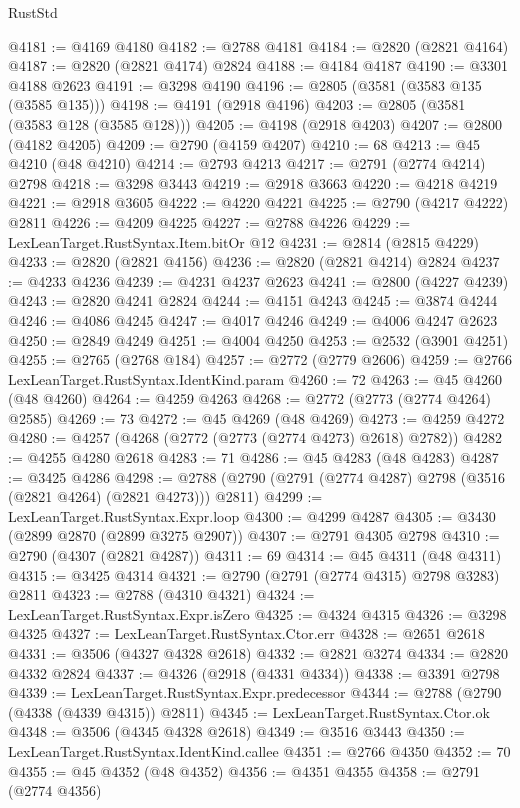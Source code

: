 \begin{lexlean}{RustStd}
\begin{coremodule}
@4181 := @4169 @4180
@4182 := @2788 @4181
@4184 := @2820 (@2821 @4164)
@4187 := @2820 (@2821 @4174) @2824
@4188 := @4184 @4187
@4190 := @3301 @4188 @2623
@4191 := @3298 @4190
@4196 := @2805 (@3581 (@3583 @135 (@3585 @135)))
@4198 := @4191 (@2918 @4196)
@4203 := @2805 (@3581 (@3583 @128 (@3585 @128)))
@4205 := @4198 (@2918 @4203)
@4207 := @2800 (@4182 @4205)
@4209 := @2790 (@4159 @4207)
@4210 := 68
@4213 := @45 @4210 (@48 @4210)
@4214 := @2793 @4213
@4217 := @2791 (@2774 @4214) @2798
@4218 := @3298 @3443
@4219 := @2918 @3663
@4220 := @4218 @4219
@4221 := @2918 @3605
@4222 := @4220 @4221
@4225 := @2790 (@4217 @4222) @2811
@4226 := @4209 @4225
@4227 := @2788 @4226
@4229 := LexLeanTarget.RustSyntax.Item.bitOr @12
@4231 := @2814 (@2815 @4229)
@4233 := @2820 (@2821 @4156)
@4236 := @2820 (@2821 @4214) @2824
@4237 := @4233 @4236
@4239 := @4231 @4237 @2623
@4241 := @2800 (@4227 @4239)
@4243 := @2820 @4241 @2824
@4244 := @4151 @4243
@4245 := @3874 @4244
@4246 := @4086 @4245
@4247 := @4017 @4246
@4249 := @4006 @4247 @2623
@4250 := @2849 @4249
@4251 := @4004 @4250
@4253 := @2532 (@3901 @4251)
@4255 := @2765 (@2768 @184)
@4257 := @2772 (@2779 @2606)
@4259 := @2766 LexLeanTarget.RustSyntax.IdentKind.param
@4260 := 72
@4263 := @45 @4260 (@48 @4260)
@4264 := @4259 @4263
@4268 := @2772 (@2773 (@2774 @4264) @2585)
@4269 := 73
@4272 := @45 @4269 (@48 @4269)
@4273 := @4259 @4272
@4280 := @4257 (@4268 (@2772 (@2773 (@2774 @4273) @2618) @2782))
@4282 := @4255 @4280 @2618
@4283 := 71
@4286 := @45 @4283 (@48 @4283)
@4287 := @3425 @4286
@4298 := @2788 (@2790 (@2791 (@2774 @4287) @2798 (@3516 (@2821 @4264) (@2821 @4273))) @2811)
@4299 := LexLeanTarget.RustSyntax.Expr.loop
@4300 := @4299 @4287
@4305 := @3430 (@2899 @2870 (@2899 @3275 @2907))
@4307 := @2791 @4305 @2798
@4310 := @2790 (@4307 (@2821 @4287))
@4311 := 69
@4314 := @45 @4311 (@48 @4311)
@4315 := @3425 @4314
@4321 := @2790 (@2791 (@2774 @4315) @2798 @3283) @2811
@4323 := @2788 (@4310 @4321)
@4324 := LexLeanTarget.RustSyntax.Expr.isZero
@4325 := @4324 @4315
@4326 := @3298 @4325
@4327 := LexLeanTarget.RustSyntax.Ctor.err
@4328 := @2651 @2618
@4331 := @3506 (@4327 @4328 @2618)
@4332 := @2821 @3274
@4334 := @2820 @4332 @2824
@4337 := @4326 (@2918 (@4331 @4334))
@4338 := @3391 @2798
@4339 := LexLeanTarget.RustSyntax.Expr.predecessor
@4344 := @2788 (@2790 (@4338 (@4339 @4315)) @2811)
@4345 := LexLeanTarget.RustSyntax.Ctor.ok
@4348 := @3506 (@4345 @4328 @2618)
@4349 := @3516 @3443
@4350 := LexLeanTarget.RustSyntax.IdentKind.callee
@4351 := @2766 @4350
@4352 := 70
@4355 := @45 @4352 (@48 @4352)
@4356 := @4351 @4355
@4358 := @2791 (@2774 @4356)

\end{coremodule}
\end{lexlean}
